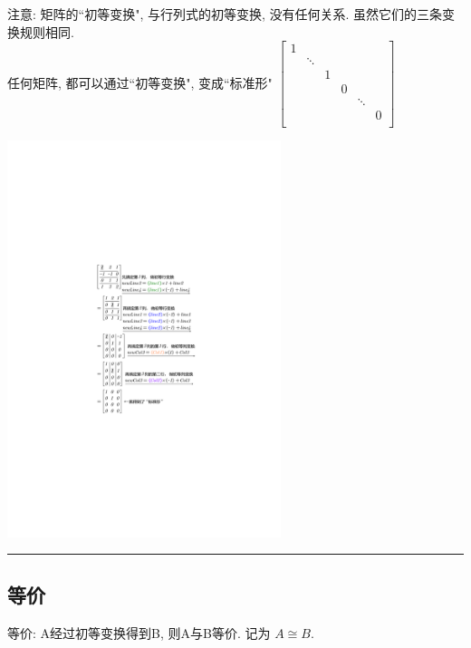 \documentclass[UTF8]{ctexart}
\begin{document}
注意: 矩阵的``初等变换", 与行列式的初等变换, 没有任何关系. 虽然它们的三条变换规则相同.\\

任何矩阵, 都可以通过``初等变换", 变成``标准形" $
\left[ \begin{matrix}
	1&		&		&		&		&		\\
	&		\ddots&		&		&		&		\\
	&		&		1&		&		&		\\
	&		&		&		0&		&		\\
	&		&		&		&		\ddots&		\\
	&		&		&		&		&		0\\
\end{matrix} \right] 
$ 

\begin{myEnvSample}
	\includegraphics[width=0.6\textwidth]{img/0035.pdf}
\end{myEnvSample}

\hrule

\subsection{等价}

等价: A经过初等变换得到B, 则A与B等价. 记为 $A\cong B$.\\
\end{document}
